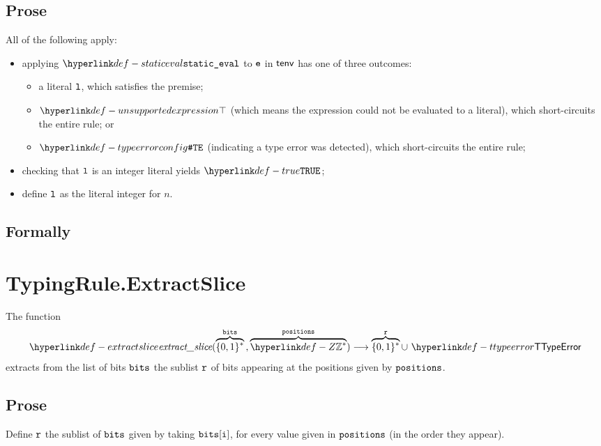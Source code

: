 \subsection{Prose}
All of the following apply:
\begin{itemize}
  \item applying $\staticeval$ to $\ve$ in $\tenv$ has one of three outcomes:
  \begin{itemize}
  \item a literal $\vl$, which satisfies the premise;
  \item $\CannotBeTransformed$ (which means the expression could not be evaluated to a literal),
  which short-circuits the entire rule;
  or
  \item $\TypeErrorConfig$ (indicating a type error was detected), which short-circuits the entire rule;
  \end{itemize}
  \item checking that $\vl$ is an integer literal yields $\True$\ProseOrTypeError;
  \item define $\vl$ as the literal integer for $n$.
\end{itemize}

\subsection{Formally}
\begin{mathpar}
\end{mathpar}

\section{TypingRule.ExtractSlice \label{sec:TypingRule.ExtractSlice}}
\hypertarget{def-extractslice}{}
The function
\[
  \extractslice(\overname{\{0,1\}^*}{\bits} \aslsep \overname{\Z^*}{\positions}) \aslto
  \overname{\{0,1\}^*}{\vr} \cup\ \TTypeError
\]
extracts from the list of bits $\bits$ the sublist $\vr$ of bits appearing at the positions given by $\positions$.
\ProseOtherwiseTypeError

\subsection{Prose}
Define $\vr$ the sublist of $\bits$ given by taking $\bits[\vi]$, for every value given in $\positions$ (in the order they appear).

